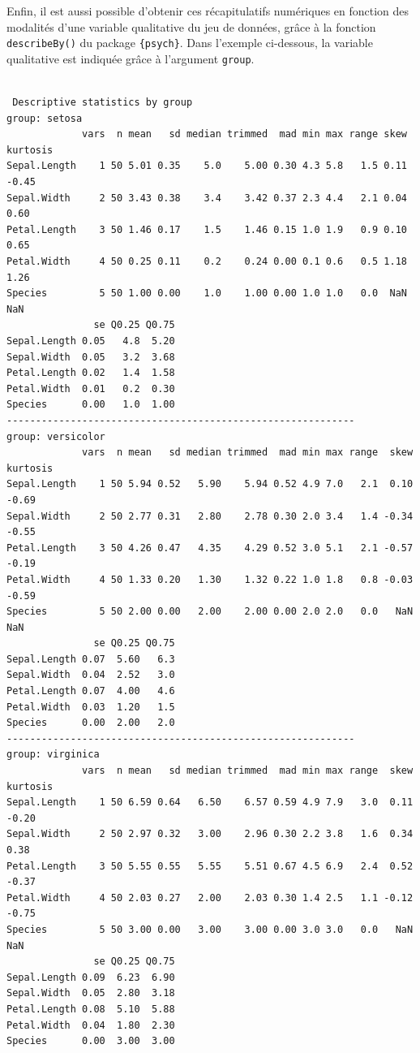 \documentclass[
  letterpaper,
]{book}
\newenvironment{Shaded}{\begin{snugshade}}{\end{snugshade}}
\newcommand{\AttributeTok}[1]{\textcolor[rgb]{0.40,0.45,0.13}{#1}}
\newcommand{\FloatTok}[1]{\textcolor[rgb]{0.68,0.00,0.00}{#1}}
\newcommand{\FunctionTok}[1]{\textcolor[rgb]{0.28,0.35,0.67}{#1}}
\newcommand{\NormalTok}[1]{\textcolor[rgb]{0.00,0.23,0.31}{#1}}
\newcommand{\SpecialCharTok}[1]{\textcolor[rgb]{0.37,0.37,0.37}{#1}}
\begin{document}
Enfin, il est aussi possible d'obtenir ces récapitulatifs numériques en
fonction des modalités d'une variable qualitative du jeu de données,
grâce à la fonction \texttt{describeBy()} du package \texttt{\{psych\}}.
Dans l'exemple ci-dessous, la variable qualitative est indiquée grâce à
l'argument \texttt{group}.

\begin{Shaded}
\end{Shaded}

\begin{verbatim}

 Descriptive statistics by group 
group: setosa
             vars  n mean   sd median trimmed  mad min max range skew kurtosis
Sepal.Length    1 50 5.01 0.35    5.0    5.00 0.30 4.3 5.8   1.5 0.11    -0.45
Sepal.Width     2 50 3.43 0.38    3.4    3.42 0.37 2.3 4.4   2.1 0.04     0.60
Petal.Length    3 50 1.46 0.17    1.5    1.46 0.15 1.0 1.9   0.9 0.10     0.65
Petal.Width     4 50 0.25 0.11    0.2    0.24 0.00 0.1 0.6   0.5 1.18     1.26
Species         5 50 1.00 0.00    1.0    1.00 0.00 1.0 1.0   0.0  NaN      NaN
               se Q0.25 Q0.75
Sepal.Length 0.05   4.8  5.20
Sepal.Width  0.05   3.2  3.68
Petal.Length 0.02   1.4  1.58
Petal.Width  0.01   0.2  0.30
Species      0.00   1.0  1.00
------------------------------------------------------------ 
group: versicolor
             vars  n mean   sd median trimmed  mad min max range  skew kurtosis
Sepal.Length    1 50 5.94 0.52   5.90    5.94 0.52 4.9 7.0   2.1  0.10    -0.69
Sepal.Width     2 50 2.77 0.31   2.80    2.78 0.30 2.0 3.4   1.4 -0.34    -0.55
Petal.Length    3 50 4.26 0.47   4.35    4.29 0.52 3.0 5.1   2.1 -0.57    -0.19
Petal.Width     4 50 1.33 0.20   1.30    1.32 0.22 1.0 1.8   0.8 -0.03    -0.59
Species         5 50 2.00 0.00   2.00    2.00 0.00 2.0 2.0   0.0   NaN      NaN
               se Q0.25 Q0.75
Sepal.Length 0.07  5.60   6.3
Sepal.Width  0.04  2.52   3.0
Petal.Length 0.07  4.00   4.6
Petal.Width  0.03  1.20   1.5
Species      0.00  2.00   2.0
------------------------------------------------------------ 
group: virginica
             vars  n mean   sd median trimmed  mad min max range  skew kurtosis
Sepal.Length    1 50 6.59 0.64   6.50    6.57 0.59 4.9 7.9   3.0  0.11    -0.20
Sepal.Width     2 50 2.97 0.32   3.00    2.96 0.30 2.2 3.8   1.6  0.34     0.38
Petal.Length    3 50 5.55 0.55   5.55    5.51 0.67 4.5 6.9   2.4  0.52    -0.37
Petal.Width     4 50 2.03 0.27   2.00    2.03 0.30 1.4 2.5   1.1 -0.12    -0.75
Species         5 50 3.00 0.00   3.00    3.00 0.00 3.0 3.0   0.0   NaN      NaN
               se Q0.25 Q0.75
Sepal.Length 0.09  6.23  6.90
Sepal.Width  0.05  2.80  3.18
Petal.Length 0.08  5.10  5.88
Petal.Width  0.04  1.80  2.30
Species      0.00  3.00  3.00
\end{verbatim}
\end{document}
